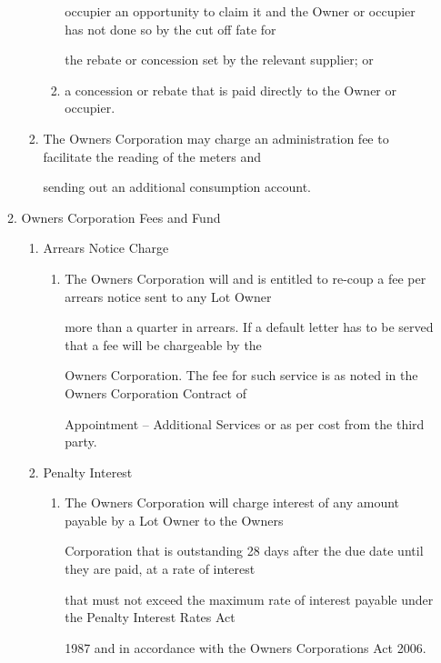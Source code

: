 \documentclass{article}
\begin{document}
\begin{enumerate}[label=\arabic*.]
\begin{enumerate}[label=\arabic{enumi}.\arabic*.]
\begin{enumerate}[label=(\arabic*)]
\begin{enumerate}[label=(\alph*)]
occupier an opportunity to claim it and the Owner or occupier has not done so by the cut off fate for 

the rebate or concession set by the relevant supplier; or 

\item  a concession or rebate that is paid directly to the Owner or occupier. 

\newpage

\end{enumerate}
\item  The Owners Corporation may charge an administration fee to facilitate the reading of the meters and 

sending out an additional consumption account. 

\end{enumerate}
\item  Owners Corporation Fees and Fund 

\begin{enumerate}[label=(\arabic*)]
\item  Arrears Notice Charge 

\begin{enumerate}[label=(\alph*)]
\item  The Owners Corporation will and is entitled to re-coup a fee per arrears notice sent to any Lot Owner 

more than a quarter in arrears. If a default letter has to be served that a fee will be chargeable by the 

Owners Corporation. The fee for such service is as noted in the Owners Corporation Contract of 

Appointment – Additional Services or as per cost from the third party. 

\end{enumerate}
\item  Penalty Interest 

\begin{enumerate}[label=(\alph*)]
\item  The Owners Corporation will charge interest of any amount payable by a Lot Owner to the Owners 

Corporation that is outstanding 28 days after the due date until they are paid, at a rate of interest 

that must not exceed the maximum rate of interest payable under the Penalty Interest Rates Act 

1987 and in accordance with the Owners Corporations Act 2006. 


\end{enumerate}
\end{enumerate}
\end{enumerate}
\end{enumerate}
\end{document}
